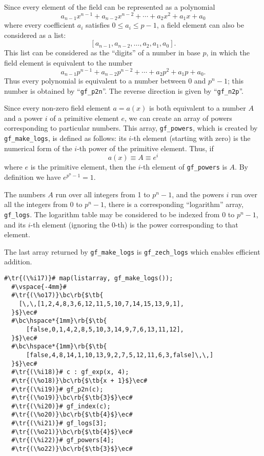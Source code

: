\documentclass[a4paper,11pt,leqno,fleqn]{artikel3}
\newcommand{\bc}{\begin{center}}
\newcommand{\ec}{\end{center}}
\newcommand{\tr}[1]{\textcolor{red}{#1}}
\newcommand{\tb}[1]{\textcolor{blue}{#1}}
\newcommand{\rb}[1]{\raisebox{2mm}[0mm][1mm]{#1}}
\begin{document}
Since every element of the field can be represented as a polynomial
\[
a_{n-1}x^{n-1}+a_{n-2}x^{n-2}+\cdots+a_2x^2+a_1x+a_0
\]
where every coefficient $a_i$ satisfies $0\le a_i\le p-1$, a field element can
also be considered as a list:
\[
[a_{n-1},a_{n-2},\ldots,a_2,a_1,a_0].
\]
This list can be considered as the ``digits'' of a number in base $p$, in
which the field element is equivalent to the number
\[
a_{n-1}p^{n-1}+a_{n-2}p^{n-2}+\cdots+a_2p^2+a_1p+a_0.
\]
Thus every polynomial is equivalent to a number between 0 and $p^n-1$; this
number is obtained by ``\texttt{gf\_p2n}''. 
The reverse direction is given by ``\texttt{gf\_n2p}''.

Since every non-zero field element $a=a(x)$ is both equivalent to a number $A$
and a power $i$ of a primitive element $e$, we can create an array of powers
corresponding to particular numbers.  This array, \texttt{gf\_powers},
which is created by \verb!gf_make_logs!, 
is defined as follows: 
its $i$-th element (starting with zero) is the numerical form of the $i$-th power of the 
primitive element.  Thus, if
\[
a(x)\equiv A\equiv e^i
\]
where $e$ is the primitive element, then the $i$-th element of \texttt{gf\_powers} is
$A$.  By definition we have $e^{p^n-1}=1$.

The numbers $A$ run over all integers from 1 to $p^n-1$, and the powers $i$
run over all the integers from 0 to $p^n-1$, there is a corresponding
``logarithm'' array, \texttt{gf\_logs}.  
The logarithm table may be considered to be
indexed from 0 to $p^n-1$, and its $i$-th element (ignoring the 0-th) is the power 
corresponding to that element.

The last array returned by \verb!gf_make_logs! is \verb!gf_zech_logs! 
which enables efficient addition. 

\vspace*{2mm}
\begin{lstlisting}[escapechar=\#]
  #\tr{(\%i17)}# map(listarray, gf_make_logs());
  #\vspace{-4mm}#
  #\tr{(\%o17)}\bc\rb{$\tb{
    [\,\,[1,2,4,8,3,6,12,11,5,10,7,14,15,13,9,1], 
  }$}\ec#
  #\bc\hspace*{1mm}\rb{$\tb{
      [false,0,1,4,2,8,5,10,3,14,9,7,6,13,11,12],
  }$}\ec#
  #\bc\hspace*{1mm}\rb{$\tb{
      [false,4,8,14,1,10,13,9,2,7,5,12,11,6,3,false]\,\,]
  }$}\ec#
  #\tr{(\%i18)}# c : gf_exp(x, 4);
  #\tr{(\%o18)}\bc\rb{$\tb{x + 1}$}\ec#
  #\tr{(\%i19)}# gf_p2n(c);
  #\tr{(\%o19)}\bc\rb{$\tb{3}$}\ec#
  #\tr{(\%i20)}# gf_index(c);
  #\tr{(\%o20)}\bc\rb{$\tb{4}$}\ec#
  #\tr{(\%i21)}# gf_logs[3];
  #\tr{(\%o21)}\bc\rb{$\tb{4}$}\ec#
  #\tr{(\%i22)}# gf_powers[4];
  #\tr{(\%o22)}\bc\rb{$\tb{3}$}\ec#
\end{lstlisting}
\end{document}

